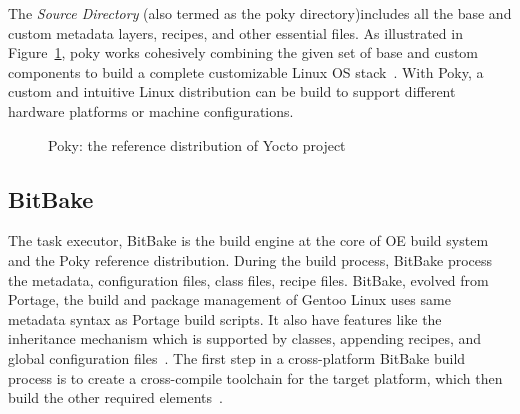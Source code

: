 The \emph{Source Directory} (also termed as the poky directory)includes all the base and custom metadata layers, recipes, and other essential files. As illustrated in Figure~\ref{fig:Poky: the reference distribution of Yocto project}, poky works cohesively combining the given set of base and custom components to build a complete customizable Linux OS stack~\parencite{salvador2014embedded}. With Poky, a custom and intuitive Linux distribution can be build to support different hardware platforms or machine configurations.
\vspace{0.5cm}
\begin{figure}[H]
\centering
{}
\caption[Poky: the reference distribution of Yocto project]{Poky: the reference distribution of Yocto project\footnotemark}
\label{fig:Poky: the reference distribution of Yocto project}
\end{figure}
\vspace{0.5cm}
\subsection{BitBake} \label{section:bitbake}
The task executor, BitBake is the build engine at the core of \ac{OE} build system and the Poky reference distribution. During the build process, BitBake process the metadata, configuration files, class files, recipe files. BitBake, evolved from Portage, the build and package management of Gentoo Linux uses same metadata syntax as Portage build scripts. It also have features like the inheritance mechanism which is supported by classes, appending recipes, and global configuration files~\parencite{Reference1}. The first step in a cross-platform BitBake build process is to create a cross-compile toolchain for the target platform, which then build the other required elements~\parencite{veromannembedded}.


